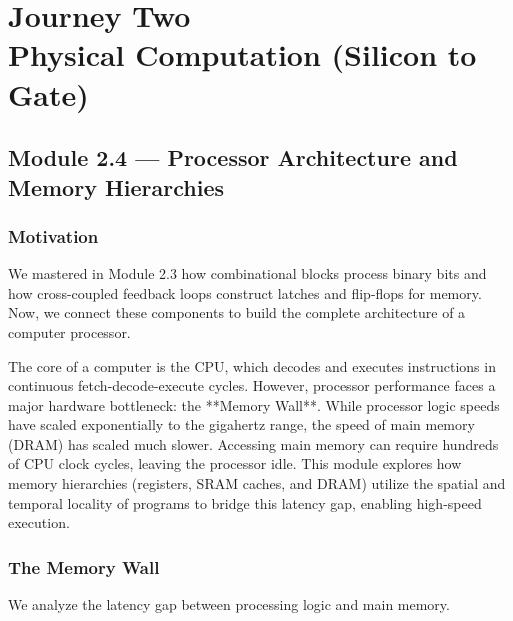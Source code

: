 \documentclass[12pt, a4paper]{book}
\begin{document}
\setcounter{chapter}{1}
\chapter[Journey 2 --- Physical Computation (Silicon to Gate)]
        {Journey Two\\[8pt]
         \textcolor{ModuleColor}{\large Physical Computation (Silicon to Gate)}}
\setcounter{section}{3}

\section{Module 2.4 --- Processor Architecture and Memory Hierarchies}
\label{sec:mod2.4}

\subsection*{Motivation}

We mastered in Module 2.3 how combinational blocks process binary bits and how cross-coupled feedback loops construct latches and flip-flops for memory.
Now, we connect these components to build the complete architecture of a computer processor.

The core of a computer is the CPU, which decodes and executes instructions in continuous fetch-decode-execute cycles.
However, processor performance faces a major hardware bottleneck: the **Memory Wall**.
While processor logic speeds have scaled exponentially to the gigahertz range, the speed of main memory (DRAM) has scaled much slower.
Accessing main memory can require hundreds of CPU clock cycles, leaving the processor idle.
This module explores how memory hierarchies (registers, SRAM caches, and DRAM) utilize the spatial and temporal locality of programs to bridge this latency gap, enabling high-speed execution.

\subsection{The Memory Wall}

We analyze the latency gap between processing logic and main memory.
\end{document}
